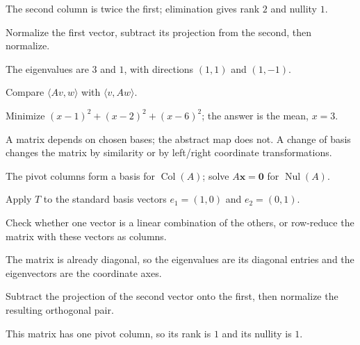 \begin{selectedhints}
    \item The second column is twice the first; elimination gives rank $2$ and nullity $1$.
    \item Normalize the first vector, subtract its projection from the second, then normalize.
    \item The eigenvalues are $3$ and $1$, with directions $(1,1)$ and $(1,-1)$.
    \item Compare $\langle Av,w\rangle$ with $\langle v,Aw\rangle$.
    \item Minimize $(x-1)^2+(x-2)^2+(x-6)^2$; the answer is the mean, $x=3$.
    \item A matrix depends on chosen bases; the abstract map does not. A change of basis changes the matrix by similarity or by left/right coordinate transformations.
    \item The pivot columns form a basis for $\operatorname{Col}(A)$; solve $A\mathbf{x}=\mathbf{0}$ for $\operatorname{Nul}(A)$.
    \item Apply $T$ to the standard basis vectors $e_1=(1,0)$ and $e_2=(0,1)$.
    \item Check whether one vector is a linear combination of the others, or row-reduce the matrix with these vectors as columns.
    \item The matrix is already diagonal, so the eigenvalues are its diagonal entries and the eigenvectors are the coordinate axes.
    \item Subtract the projection of the second vector onto the first, then normalize the resulting orthogonal pair.
    \item This matrix has one pivot column, so its rank is $1$ and its nullity is $1$.
\end{selectedhints}
